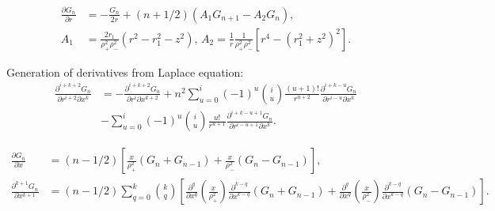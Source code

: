 \documentclass[a4paper,12pt]{article}
\begin{document}
\begin{align}
  \frac{\partial G_{n}}{\partial r}
  &=
  -\frac{G_{n}}{2r}
  + (n+1/2)
  \left(
    A_{1}G_{n+1} -A_{2}G_{n}
  \right),\\
  A_{1}
  &=
  \frac{2r_{1}}{\rho_{+}^{2}\rho_{-}^{2}}
  \left(
    r^{2} - r_{1}^{2} - z^{2}
  \right),\,
  A_{2}
  =
  \frac{1}{r}\frac{1}{\rho_{+}^{2}\rho_{-}^{2}}
  \left[
    r^{4} - (r_{1}^{2}+z^{2})^{2}
  \right].
\end{align}

Generation of derivatives from Laplace equation:
\begin{align}
  \frac{\partial^{i+k+2}G_{n}}{\partial r^{i+2}\partial x^{k}}
    &=
    -\frac{\partial^{i+k+2} G_{n}}{\partial r^{i} \partial x^{k+2}}
    +
    n^{2}
    \sum_{u=0}^{i}
    (-1)^u \binom{i}{u} \frac{(u+1)!}{r^{u+2}}
    \frac{\partial^{i+k-u} G_{n}}{\partial r^{i-u}\partial x^{k}}\nonumber\\
    &-
    \sum_{u=0}^{i}
    (-1)^u \binom{i}{u} \frac{u!}{r^{u+1}}
    \frac{\partial^{i+k-u+1} G_{n}}{\partial r^{i-u+1}\partial x^{k}}.
\end{align}

\begin{align}
  \frac{\partial G_{n}}{\partial x}
  &=
  (n-1/2)
  \left[
    \frac{x}{\rho_{+}^{2}}(G_{n} + G_{n-1})
    +
    \frac{x}{\rho_{-}^{2}}(G_{n} - G_{n-1})
  \right],\\
  \frac{\partial^{k+1}G_{n}}{\partial x^{k+1}}
  &=
  (n-1/2)
  \sum_{q=0}^{k}
  \binom{k}{q}
  \left[
    \frac{\partial^{q}}{\partial x^{q}}
    \left(
      \frac{x}{\rho_{+}^{2}}
    \right)
    \frac{\partial^{k-q}}{\partial x^{k-q}}
    \left(G_{n}+G_{n-1}\right)
    +
    \frac{\partial^{q}}{\partial x^{q}}
    \left(
      \frac{x}{\rho_{-}^{2}}
    \right)
    \frac{\partial^{k-q}}{\partial x^{k-q}}
    \left(G_{n}-G_{n-1}\right)
  \right].
\end{align}
\end{document}
